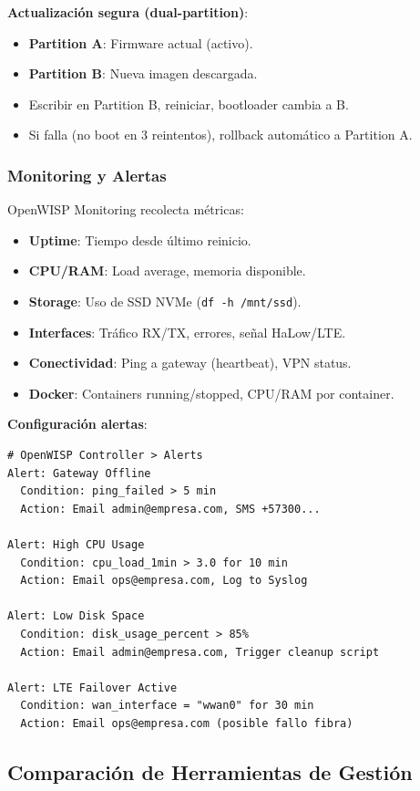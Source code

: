 \textbf{Actualización segura (dual-partition)}:
\begin{itemize}
    \item \textbf{Partition A}: Firmware actual (activo).
    \item \textbf{Partition B}: Nueva imagen descargada.
    \item Escribir en Partition B, reiniciar, bootloader cambia a B.
    \item Si falla (no boot en 3 reintentos), rollback automático a Partition A.
\end{itemize}

\subsubsection{Monitoring y Alertas}

OpenWISP Monitoring recolecta métricas:
\begin{itemize}
    \item \textbf{Uptime}: Tiempo desde último reinicio.
    \item \textbf{CPU/RAM}: Load average, memoria disponible.
    \item \textbf{Storage}: Uso de SSD NVMe (\texttt{df -h /mnt/ssd}).
    \item \textbf{Interfaces}: Tráfico RX/TX, errores, señal HaLow/LTE.
    \item \textbf{Conectividad}: Ping a gateway (heartbeat), VPN status.
    \item \textbf{Docker}: Containers running/stopped, CPU/RAM por container.
\end{itemize}

\textbf{Configuración alertas}:
\begin{verbatim}
# OpenWISP Controller > Alerts
Alert: Gateway Offline
  Condition: ping_failed > 5 min
  Action: Email admin@empresa.com, SMS +57300...

Alert: High CPU Usage
  Condition: cpu_load_1min > 3.0 for 10 min
  Action: Email ops@empresa.com, Log to Syslog

Alert: Low Disk Space
  Condition: disk_usage_percent > 85%
  Action: Email admin@empresa.com, Trigger cleanup script

Alert: LTE Failover Active
  Condition: wan_interface = "wwan0" for 30 min
  Action: Email ops@empresa.com (posible fallo fibra)
\end{verbatim}

\subsection{Comparación de Herramientas de Gestión}

